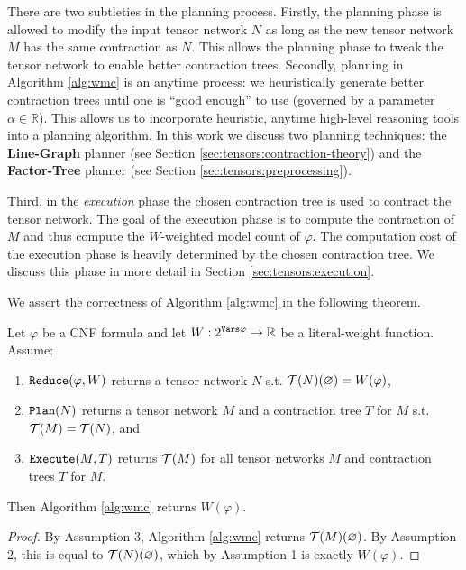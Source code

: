 There are two subtleties in the planning process. 
Firstly, the planning phase is allowed to modify the input tensor network $N$ as long as the new tensor network $M$ has the same contraction as $N$. 
This allows the planning phase to tweak the tensor network to enable better contraction trees.
Secondly, planning in Algorithm \ref{alg:wmc} is an anytime process: we heuristically generate better contraction trees until one is ``good enough'' to use (governed by a parameter $\alpha \in \mathbb{R}$). 
This allows us to incorporate heuristic, anytime high-level reasoning tools into a planning algorithm. 
In this work we discuss two planning techniques: the \textbf{Line-Graph} planner (see Section \ref{sec:tensors:contraction-theory}) and the \textbf{Factor-Tree} planner (see Section \ref{sec:tensors:preprocessing}).

Third, in the \emph{execution} phase the chosen contraction tree is used to contract the tensor network.
The goal of the execution phase is to compute the contraction of $M$ and thus compute the $W$-weighted model count of $\varphi$. The computation cost of the execution phase is heavily determined by the chosen contraction tree. We discuss this phase in more detail in Section \ref{sec:tensors:execution}.

We assert the correctness of Algorithm \ref{alg:wmc} in the following theorem.
\begin{theorem}
\label{thm:alg-correctness}
Let $\varphi$ be a CNF formula and let $W: 2^{\texttt{\upshape Vars}{\varphi}} \rightarrow \mathbb{R}$ be a literal-weight function.
    Assume:
    \begin{enumerate}
        \item $\texttt{\upshape Reduce}(\varphi, W)$ returns a tensor network $N$ s.t. $\mathcal{T}(N)(\varnothing) = W(\varphi)$,
        \item $\texttt{\upshape Plan}(N)$ returns a tensor network $M$ and a contraction tree $T$ for $M$ s.t. $\mathcal{T}(M) = \mathcal{T}(N)$, and
        \item $\texttt{\upshape Execute}(M, T)$ returns $\mathcal{T}(M)$ for all tensor networks $M$ and contraction trees $T$ for $M$.
    \end{enumerate}
Then Algorithm \ref{alg:wmc} returns $W(\varphi)$.
\end{theorem}
\begin{proof}
By Assumption 3, Algorithm \ref{alg:wmc} returns $\mathcal{T}(M)(\varnothing)$. 
By Assumption 2, this is equal to $\mathcal{T}(N)(\varnothing)$, which by Assumption 1 is exactly $W(\varphi)$.
\end{proof}

